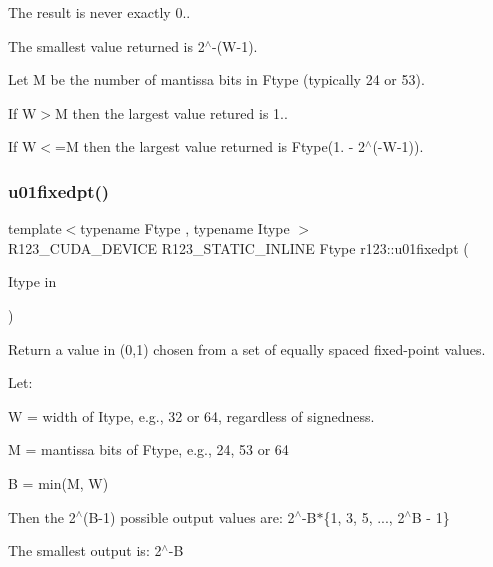 \begin{DoxyItemize}
\item The result is never exactly 0..
\item The smallest value returned is 2$^\wedge$-\/(W-\/1).
\item Let M be the number of mantissa bits in Ftype (typically 24 or 53).
\begin{DoxyItemize}
\item If W$>$M then the largest value retured is 1..
\item If W$<$=M then the largest value returned is Ftype(1. -\/ 2$^\wedge$(-\/\+W-\/1)). 
\end{DoxyItemize}
\end{DoxyItemize}\hypertarget{group__uniform_ga6d75b90f162a67226c8044c6f3198b96}{}\label{group__uniform_ga6d75b90f162a67226c8044c6f3198b96} 
\subsubsection{\texorpdfstring{u01fixedpt()}{u01fixedpt()}}
{\footnotesize\ttfamily template$<$typename Ftype , typename Itype $>$ \\
R123\+\_\+\+C\+U\+D\+A\+\_\+\+D\+E\+V\+I\+CE R123\+\_\+\+S\+T\+A\+T\+I\+C\+\_\+\+I\+N\+L\+I\+NE Ftype r123\+::u01fixedpt (\begin{DoxyParamCaption}\item[{Itype}]{in }\end{DoxyParamCaption})}



Return a value in (0,1) chosen from a set of equally spaced fixed-\/point values. 

Let\+:
\begin{DoxyItemize}
\item W = width of Itype, e.\+g., 32 or 64, regardless of signedness.
\item M = mantissa bits of Ftype, e.\+g., 24, 53 or 64
\item B = min(\+M, W)
\end{DoxyItemize}

Then the 2$^\wedge$(B-\/1) possible output values are\+: 2$^\wedge$-\/\+B$\ast$\{1, 3, 5, ..., 2$^\wedge$B -\/ 1\}

The smallest output is\+: 2$^\wedge$-\/B


